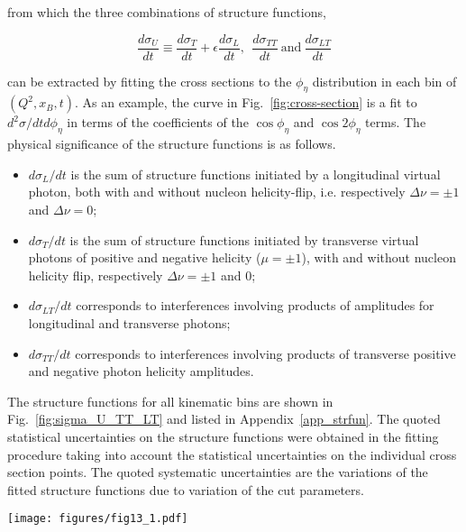 \documentclass[prc,aps,floatfix,showpacs,showkeys,twocolumn,superscriptaddress,letterpaper,10pt]{revtex4-1}
\begin{document}
\noindent
from which the three combinations of structure functions, 

\begin{equation}
\frac{d\sigma_U}{dt}\equiv \frac{d\sigma_T}{dt}+\epsilon\frac{d\sigma_L}{dt},\  \  \frac{d\sigma_{TT}}{dt}\   \text{and}\ 
\frac{d\sigma_{LT}}{dt} 
\end{equation}

\noindent can be extracted by fitting the cross sections to the $\phi_\eta$ distribution in each bin of $(Q^2,x_B,t)$. As an example,  the  curve in Fig.~\ref{fig:cross-section} is a fit to $d^2\sigma/dtd\phi_\eta$ in terms of the coefficients of the $\cos \phi_\eta$ and $\cos 2\phi_\eta$ terms.
The physical significance of the structure functions is as follows.
\begin{itemize}
\item $d\sigma_L/dt$  is the sum of structure functions initiated by a longitudinal virtual photon, both with and without nucleon helicity-flip, i.e. respectively $\Delta \nu = \pm 1$ and $\Delta \nu = 0$;

\item $d\sigma_T/dt$ is the sum of structure functions initiated by  transverse virtual photons of positive and negative helicity ($\mu = \pm 1$), with and without nucleon helicity flip, respectively $\Delta \nu = \pm 1$ and  $0$;

\item $d\sigma_{LT}/dt$ corresponds to interferences involving products  of amplitudes for longitudinal and transverse photons;

\item $d\sigma_{TT}/dt$ corresponds to interferences involving products  of transverse positive and negative photon helicity amplitudes.

\end{itemize}


The structure functions for all kinematic bins are shown in Fig.~\ref{fig:sigma_U_TT_LT} and listed in Appendix~\ref{app_strfun}. The quoted statistical uncertainties on the structure functions were obtained in the fitting  procedure taking into account the statistical uncertainties on the individual cross section points.  The quoted systematic uncertainties are the  variations of the fitted structure functions due to variation of the cut parameters.



\begin{figure*}
\texttt{[image: figures/fig13\_1.pdf]}

\caption{The structure functions vs. $t$ for the different $(Q^2,x_B)$ bins, extracted from the present experiment. 
Black circules: $d\sigma_U/dt$. Red squares: $d\sigma_{LT}/dt$. Blue triangles: $d\sigma_{TT}/dt$. 
The black, red and blue curves are the corresponding results of the  handbag based calculation of 
Ref.~\cite{Goloskokov:2011rd}.
The inset is an enlarged view of the bin with $x_B=0.17$ and $Q^2=1.87$ GeV$^2$.
The error bars are statistical only.
}
\label{fig:sigma_U_TT_LT}
\end{figure*}
\end{document}
